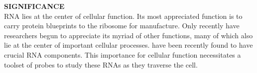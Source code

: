 

\textbf{SIGNIFICANCE}\\
RNA lies at the center of cellular function. Its most appreciated function is to carry protein blueprints to the ribosome for manufacture. Only recently have researchers begun to appreciate its myriad of other functions, many of which also lie at the center of important cellular processes.\cite{CechNoncodingRNARevolution2014}  have been recently found to have crucial RNA components.
This importance for cellular function necessitates a toolset of probes to study these RNAs as they traverse the cell.

